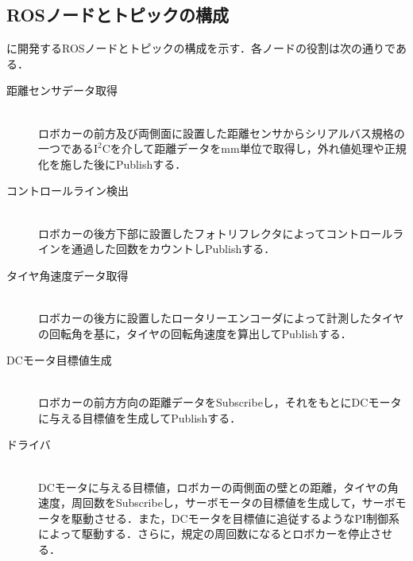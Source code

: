 \newpage
\subsection{ROSノードとトピックの構成}
に開発するROSノードとトピックの構成を示す．各ノードの役割は次の通りである．
\begin{description}

    \item[距離センサデータ取得] \mbox{} \\
      ロボカーの前方及び両側面に設置した距離センサからシリアルバス規格の一つである$\mathrm{I^2C}$を介して距離データを$\mathrm{mm}$単位で取得し，外れ値処理や正規化を施した後にPublishする．
    \item[コントロールライン検出] \mbox{} \\
      ロボカーの後方下部に設置したフォトリフレクタによってコントロールラインを通過した回数をカウントしPublishする．

    \item[タイヤ角速度データ取得] \mbox{} \\
      ロボカーの後方に設置したロータリーエンコーダによって計測したタイヤの回転角を基に，タイヤの回転角速度を算出してPublishする．

    \item[DCモータ目標値生成] \mbox{} \\
      ロボカーの前方方向の距離データをSubscribeし，それをもとにDCモータに与える目標値を生成してPublishする．

    \item[ドライバ] \mbox{} \\
      DCモータに与える目標値，ロボカーの両側面の壁との距離，タイヤの角速度，周回数をSubscribeし，サーボモータの目標値を生成して，サーボモータを駆動させる．また，DCモータを目標値に追従するようなPI制御系によって駆動する．さらに，規定の周回数になるとロボカーを停止させる．


  \end{description}
